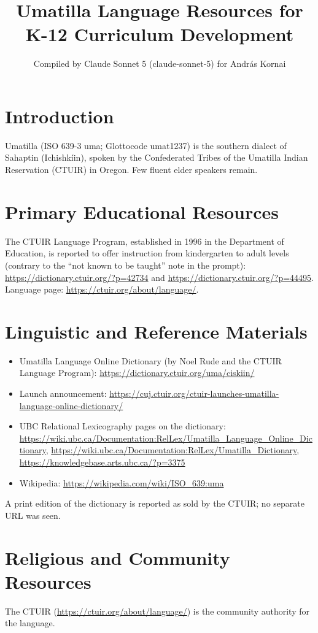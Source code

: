 \documentclass[12pt]{article}
\title{Umatilla Language Resources for K-12 Curriculum Development}
\author{Compiled by Claude Sonnet 5 (claude-sonnet-5) for Andr\'as Kornai}
\date{}
\begin{document}
\maketitle

\section{Introduction}
Umatilla (ISO 639-3 uma; Glottocode umat1237) is the southern dialect of Sahaptin (Ichishk\'iin), spoken by the Confederated Tribes of the Umatilla Indian Reservation (CTUIR) in Oregon. Few fluent elder speakers remain.

\section{Primary Educational Resources}
The CTUIR Language Program, established in 1996 in the Department of Education, is reported to offer instruction from kindergarten to adult levels (contrary to the ``not known to be taught'' note in the prompt): \url{https://dictionary.ctuir.org/?p=42734} and \url{https://dictionary.ctuir.org/?p=44495}. Language page: \url{https://ctuir.org/about/language/}.

\section{Linguistic and Reference Materials}
\begin{itemize}
\item Umatilla Language Online Dictionary (by Noel Rude and the CTUIR Language Program): \url{https://dictionary.ctuir.org/uma/ciskiin/}
\item Launch announcement: \url{https://cuj.ctuir.org/ctuir-launches-umatilla-language-online-dictionary/}
\item UBC Relational Lexicography pages on the dictionary: \url{https://wiki.ubc.ca/Documentation:RelLex/Umatilla_Language_Online_Dictionary}, \url{https://wiki.ubc.ca/Documentation:RelLex/Umatilla_Dictionary}, \url{https://knowledgebase.arts.ubc.ca/?p=3375}
\item Wikipedia: \url{https://wikipedia.com/wiki/ISO_639:uma}
\end{itemize}
A print edition of the dictionary is reported as sold by the CTUIR; no separate URL was seen.

\section{Religious and Community Resources}
The CTUIR (\url{https://ctuir.org/about/language/}) is the community authority for the language.
\end{document}
